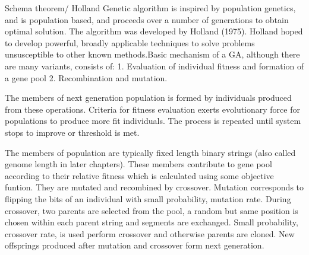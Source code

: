 
Schema theorem/ Holland
Genetic algorithm is inspired by population genetics, and is population based, and proceeds over a number of generations to obtain optimal solution. The algorithm was developed by Holland (1975). Holland hoped to develop powerful, broadly applicable techniques to solve problems unsusceptible to other known methods.Basic mechanism of a GA, although there are many variants, consists of:
1. Evaluation of individual fitness and formation of a gene pool
2. Recombination and mutation.

The members of next generation population is formed by individuals produced from these operations. Criteria for fitness evaluation exerts evolutionary force for populations to produce more fit individuals. The process is repeated until system stops to improve or threshold is met.

The members of population are typically fixed length binary strings (also called genome length in later chapters). These members contribute to gene pool according to their relative fitness which is calculated using some objective funtion. They are mutated and recombined by crossover. Mutation corresponds to flipping the bits of an individual with small probability, mutation rate. During crossover, two parents are selected from the pool, a random but same position is chosen within each parent string and segments are exchanged. Small probability, crossover rate, is used perform crossover and otherwise parents are cloned. New offsprings produced after mutation and crossover form next generation.





